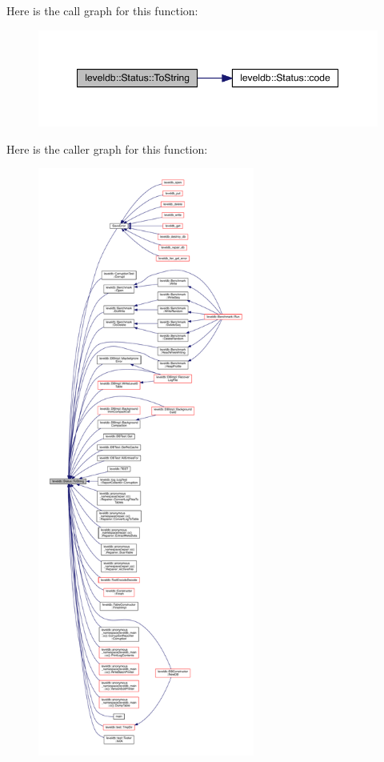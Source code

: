 Here is the call graph for this function\+:\nopagebreak
\begin{figure}[H]
\begin{center}
\leavevmode
\includegraphics[width=349pt]{classleveldb_1_1_status_aa8b56d8fe2cd1873778de5d1e5407866_cgraph}
\end{center}
\end{figure}




Here is the caller graph for this function\+:
\nopagebreak
\begin{figure}[H]
\begin{center}
\leavevmode
\includegraphics[height=550pt]{classleveldb_1_1_status_aa8b56d8fe2cd1873778de5d1e5407866_icgraph}
\end{center}
\end{figure}




